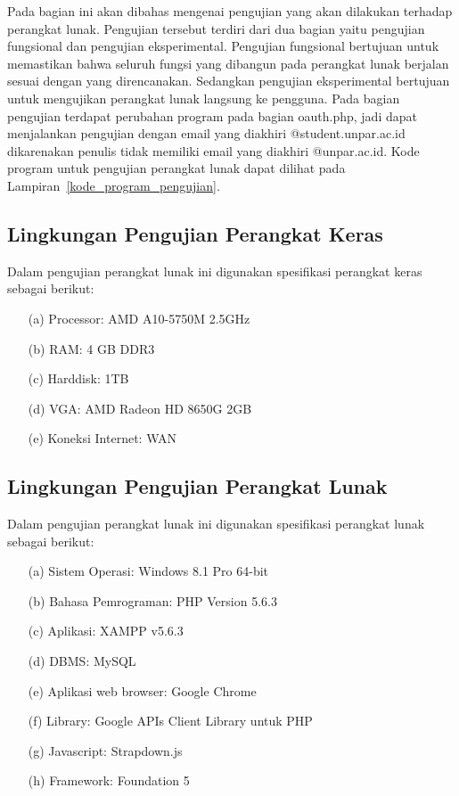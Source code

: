 Pada bagian ini akan dibahas mengenai pengujian yang akan dilakukan terhadap
perangkat lunak. Pengujian tersebut terdiri dari dua bagian yaitu pengujian
fungsional dan pengujian eksperimental. Pengujian fungsional bertujuan untuk
memastikan bahwa seluruh fungsi yang dibangun pada perangkat lunak berjalan
sesuai dengan yang direncanakan. Sedangkan pengujian eksperimental bertujuan
untuk mengujikan perangkat lunak langsung ke pengguna. Pada bagian
pengujian terdapat perubahan program pada bagian oauth.php, jadi dapat
menjalankan pengujian dengan email yang diakhiri @student.unpar.ac.id
dikarenakan penulis tidak memiliki email yang diakhiri @unpar.ac.id. Kode
program untuk pengujian perangkat lunak dapat dilihat pada
Lampiran~\ref{kode_program_pengujian}.

\subsection{Lingkungan Pengujian Perangkat Keras}
\label{sec:lingkunganpengujianperangkatkeras}

Dalam pengujian perangkat lunak ini digunakan spesifikasi perangkat keras
sebagai berikut:

\begin{enumerate}
\item[(a)] Processor: AMD A10-5750M 2.5GHz
\item[(b)] RAM: 4 GB DDR3
\item[(c)] Harddisk: 1TB
\item[(d)] VGA: AMD Radeon HD 8650G 2GB
\item[(e)] Koneksi Internet: WAN
\end{enumerate}

\subsection{Lingkungan Pengujian Perangkat Lunak}
\label{sec:lingkunganpengujianperangkatlunak}

Dalam pengujian perangkat lunak ini digunakan spesifikasi perangkat lunak
sebagai berikut:

\begin{enumerate}
\item[(a)] Sistem Operasi: Windows 8.1 Pro 64-bit
\item[(b)] Bahasa Pemrograman: PHP Version 5.6.3
\item[(c)] Aplikasi: XAMPP v5.6.3
\item[(d)] DBMS: MySQL
\item[(e)] Aplikasi web browser: Google Chrome
\item[(f)] Library: Google APIs Client Library untuk PHP
\item[(g)] Javascript: Strapdown.js
\item[(h)] Framework: Foundation 5
\end{enumerate}

